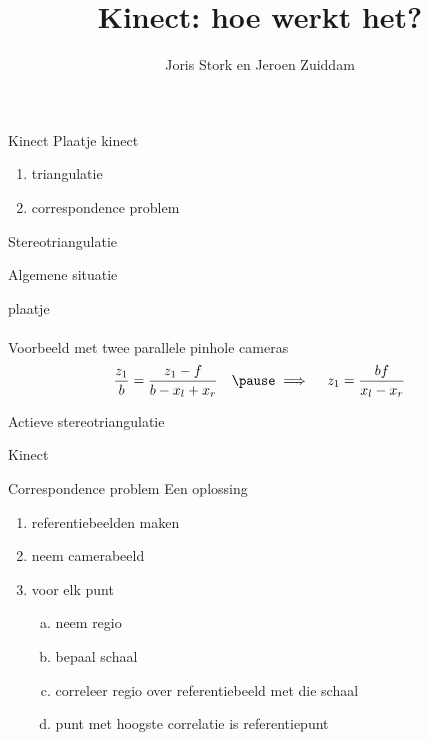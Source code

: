 \documentclass{beamer}
\author{Joris Stork en Jeroen Zuiddam}
\title{Kinect: hoe werkt het?}
\date{}
\begin{document}
\begin{frame}
\titlepage
\end{frame}
\section{}

\begin{frame}{Kinect}
Plaatje kinect
\pause
\begin{enumerate}
\item triangulatie
\item correspondence problem
\end{enumerate}
\end{frame}

\begin{frame}{Stereotriangulatie}

{\large Algemene situatie}

plaatje
\pause
\\\quad\\
{\large Voorbeeld met twee parallele pinhole cameras}
\pause
$$
\frac{z_1}{b} = \frac{z_1 - f}{b-x_l+x_r}\quad \pause\implies\quad z_1 = \frac {bf} {x_l - x_r}
$$
\end{frame}

\begin{frame}{Actieve stereotriangulatie}

{\large Kinect}
\end{frame}

\begin{frame}{Correspondence problem}
{\large Een oplossing}

\begin{enumerate}
\item<+-> referentiebeelden maken
\item<+-> neem camerabeeld
\item<+-> voor elk punt
\begin{enumerate}[a.]
\item<+-> neem regio
\item<+-> bepaal schaal
\item<+-> correleer regio over referentiebeeld met die schaal
\item<+-> punt met hoogste correlatie is referentiepunt
\end{enumerate}
\end{enumerate}
\end{frame}
\end{document}
